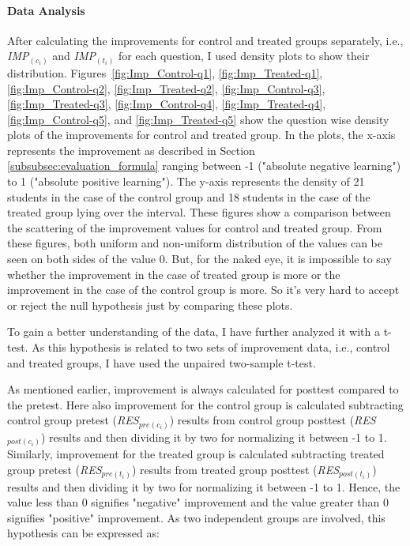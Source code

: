 \paragraph{Data Analysis}
After calculating the improvements for control and treated groups separately, i.e., \textit{IMP$_{(c_i)}$} and \textit{IMP$_{(t_i)}$} for each question, I used density plots to show their distribution. Figures~\ref{fig:Imp_Control-q1}, \ref{fig:Imp_Treated-q1}, \ref{fig:Imp_Control-q2}, \ref{fig:Imp_Treated-q2}, \ref{fig:Imp_Control-q3}, \ref{fig:Imp_Treated-q3}, \ref{fig:Imp_Control-q4}, \ref{fig:Imp_Treated-q4}, \ref{fig:Imp_Control-q5}, and \ref{fig:Imp_Treated-q5} show the question wise density plots of the improvements for control and treated group. In the plots, the x-axis represents the improvement as described in Section \ref{subsubsec:evaluation_formula} ranging between -1 ("absolute negative learning") to 1 ("absolute positive learning"). The y-axis represents the density of 21 students in the case of the control group and 18 students in the case of the treated group lying over the interval. These figures show a comparison between the scattering of the improvement values for control and treated group. From these figures, both uniform and non-uniform distribution of the values can be seen on both sides of the value 0. But, for the naked eye, it is impossible to say whether the improvement in the case of treated group is more or the improvement in the case of the control group is more. So it's very hard to accept or reject the null hypothesis just by comparing these plots.

To gain a better understanding of the data, I have further analyzed it with a t-test. As this hypothesis is related to two sets of improvement data, i.e., control and treated groups, I have used the unpaired two-sample t-test.   

As mentioned earlier, improvement is always calculated for posttest compared to the pretest. Here also improvement for the control group is calculated subtracting control group pretest (\textit{RES$_{pre(c_i)}$}) results from control group posttest (\textit{RES$_{post(c_i)}$}) results and then dividing it by two for normalizing it between -1 to 1. Similarly, improvement for the treated group is calculated subtracting treated group pretest (\textit{RES$_{pre(t_i)}$}) results from treated group posttest (\textit{RES$_{post(t_i)}$}) results and then dividing it by two for normalizing it between -1 to 1. Hence, the value less than 0 signifies "negative" improvement and the value greater than 0 signifies "positive" improvement. As two independent groups are involved, this hypothesis can be expressed as:   

